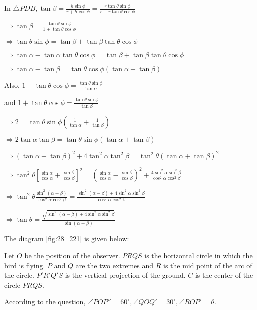   In $\triangle PDB, \tan\beta = \frac{h\sin\phi}{r + h\cos\phi} = \frac{r\tan\theta\sin\phi}{r +
    r\tan\theta\cos\phi}$

  $\Rightarrow \tan\beta = \frac{\tan\theta\sin\phi}{1 + \tan\theta\cos\phi}$

  $\Rightarrow \tan\theta\sin\phi = \tan\beta + \tan\beta\tan\theta\cos\phi$

  $\Rightarrow \tan\alpha - \tan\alpha\tan\theta\cos\phi = \tan\beta + \tan\beta\tan\theta\cos\phi$

  $\Rightarrow \tan\alpha - \tan\beta = \tan\theta\cos\phi(\tan\alpha + \tan\beta)$

  Also, $1 - \tan\theta\cos\phi = \frac{\tan\theta\sin\phi}{\tan\alpha}$

  and $1 + \tan\theta\cos\phi = \frac{\tan\theta\sin\phi}{\tan\beta}$

  $\Rightarrow 2 = \tan\theta\sin\phi\left(\frac{1}{\tan\alpha} + \frac{1}{\tan\beta}\right)$

  $\Rightarrow 2\tan\alpha\tan\beta = \tan\theta\sin\phi(\tan\alpha + \tan\beta)$

  $\Rightarrow (\tan\alpha - \tan\beta)^2 + 4\tan^2\alpha\tan^2\beta = \tan^2\theta(\tan\alpha +
  \tan\beta)^2$

  $\Rightarrow \tan^2\theta\left[\frac{\sin\alpha}{\cos\alpha} +
    \frac{\sin\beta}{\cos\beta}\right]^2 = \left(\frac{\sin\alpha}{\cos\alpha} -
  \frac{\sin\beta}{\cos\beta}\right)^2 + \frac{4\sin^2\alpha\sin^2\beta}{\cos^2\alpha\cos^2\beta}$

  $\Rightarrow \tan^2\theta\frac{\sin^2(\alpha + \beta)}{\cos^2\alpha\cos^2\beta} =
  \frac{\sin^2(\alpha - \beta) + 4\sin^2\alpha\sin^2\beta}{\cos^2\alpha\cos^2\beta}$

  $\Rightarrow \tan\theta = \frac{\sqrt{\sin^2(\alpha - \beta) +
      4\sin^2\alpha\sin^2\beta}}{\sin(\alpha + \beta)}$

\item The diagram [fig:28_221] is given below:

  \startplacefigure[reference=fig:28_221]
    \externalfigure[28_221.pdf]
  \stopplacefigure

  Let $O$ be the position of the observer. $PRQS$ is the horizontal circle in which the bird
  is flying. $P$ and $Q$ are the two extremes and $R$ is the mid point of the arc of
  the circle. $P'R'Q'S$ is the vertical projection of the ground. $C$ is the center of the
  circle $PRQS$.

  According to the question, $\angle POP'' = 60^\circ, \angle QOQ' = 30^\circ, \angle ROP'=
  \theta$.

